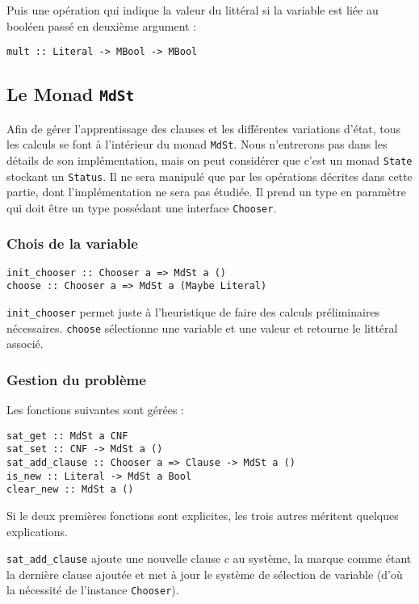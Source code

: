 Puis une opération qui indique la valeur du littéral si la variable est liée
au booléen passé en deuxième argument :
\begin{lstlisting}
mult :: Literal -> MBool -> MBool
\end{lstlisting}

\subsection{Le Monad \texttt{MdSt}}
Afin de gérer l'apprentissage des clauses et les différentes variations d'état,
tous les calculs se font à l'intérieur du monad \texttt{MdSt}. Nous n'entrerons
pas dans les détails de son implémentation, mais on peut considérer que c'est
un monad \texttt{State} stockant un \texttt{Status}. Il ne sera manipulé que
par les opérations décrites dans cette partie, dont l'implémentation ne sera
pas étudiée. Il prend un type en paramètre qui doit être un type possédant une
interface \texttt{Chooser}.

\subsubsection{Chois de la variable}
\begin{lstlisting}
init_chooser :: Chooser a => MdSt a ()
choose :: Chooser a => MdSt a (Maybe Literal)
\end{lstlisting}
\texttt{init\_chooser} permet juste à l'heuristique de faire des calculs
préliminaires nécessaires. \texttt{choose} sélectionne une variable et une
valeur et retourne le littéral associé.

\subsubsection{Gestion du problème}
Les fonctions suivantes sont gérées :
\begin{lstlisting}
sat_get :: MdSt a CNF
sat_set :: CNF -> MdSt a ()
sat_add_clause :: Chooser a => Clause -> MdSt a ()
is_new :: Literal -> MdSt a Bool
clear_new :: MdSt a ()
\end{lstlisting}

Si le deux premières fonctions sont explicites, les trois autres méritent
quelques explications.

\texttt{sat\_add\_clause} ajoute une nouvelle clause $c$ au système, la marque
comme étant la dernière clause ajoutée et met à jour le système de sélection
de variable (d'où la nécessité de l'instance \texttt{Chooser}).

